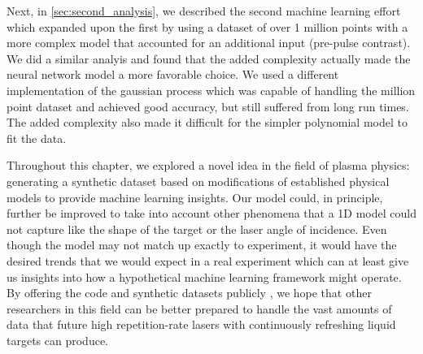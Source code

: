 Next, in \autoref{sec:second_analysis}, we described the second machine learning effort which expanded upon the first by using a dataset of over 1 million points with a more complex model that accounted for an additional input (pre-pulse contrast). We did a similar analyis and found that the added complexity actually made the neural network model a more favorable choice. We used a different implementation of the gaussian process which was capable of handling the million point dataset and achieved good accuracy, but still suffered from long run times. The added complexity also made it difficult for the simpler polynomial model to fit the data.

Throughout this chapter, we explored a novel idea in the field of plasma physics: generating a synthetic dataset based on modifications of established physical models to provide machine learning insights. Our model could, in principle, further be improved to take into account other phenomena that a 1D model could not capture like the shape of the target or the laser angle of incidence. Even though the model may not match up exactly to experiment, it would have the desired trends that we would expect in a real experiment which can at least give us insights into how a hypothetical machine learning framework might operate. By offering the code and synthetic datasets publicly \cite{Desai_2024_Zenodo, Desai_2025_Zenodo}, we hope that other researchers in this field can be better prepared to handle the vast amounts of data that future high repetition-rate lasers with continuously refreshing liquid targets can produce.
